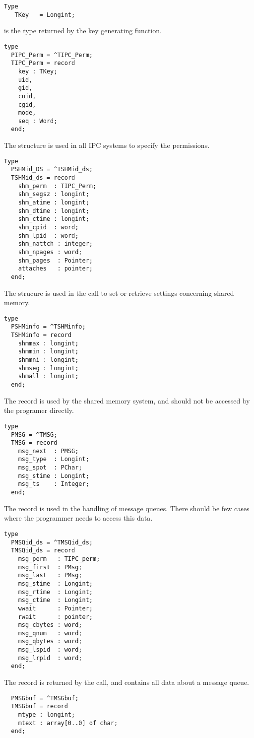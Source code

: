 \begin{verbatim}
Type 
   TKey   = Longint;
\end{verbatim}
 is the type returned by the  key generating function.
\begin{verbatim}
type
  PIPC_Perm = ^TIPC_Perm;
  TIPC_Perm = record
    key : TKey;
    uid, 
    gid,
    cuid,
    cgid,
    mode,
    seq : Word;   
  end;
\end{verbatim}
The  structure is used in all IPC systems to specify the
permissions.
\begin{verbatim}
Type  
  PSHMid_DS = ^TSHMid_ds; 
  TSHMid_ds = record
    shm_perm  : TIPC_Perm;
    shm_segsz : longint;
    shm_atime : longint;
    shm_dtime : longint;
    shm_ctime : longint;
    shm_cpid  : word;
    shm_lpid  : word;
    shm_nattch : integer;
    shm_npages : word;
    shm_pages  : Pointer;
    attaches   : pointer;
  end;
\end{verbatim}
The  strucure is used in the  call to set or
retrieve settings concerning shared memory.
\begin{verbatim}
type
  PSHMinfo = ^TSHMinfo;
  TSHMinfo = record
    shmmax : longint;
    shmmin : longint;
    shmmni : longint;
    shmseg : longint;
    shmall : longint;
  end;
\end{verbatim}
The  record is used by the shared memory system, and should
not be accessed by the programer directly.
\begin{verbatim}
type
  PMSG = ^TMSG;
  TMSG = record
    msg_next  : PMSG;
    msg_type  : Longint;
    msg_spot  : PChar;
    msg_stime : Longint;
    msg_ts    : Integer;
  end;
\end{verbatim}
The  record is used in the handling of message queues. There
should be few cases where the programmer needs to access this data.
\begin{verbatim}
type
  PMSQid_ds = ^TMSQid_ds;
  TMSQid_ds = record
    msg_perm   : TIPC_perm;
    msg_first  : PMsg;
    msg_last   : PMsg;
    msg_stime  : Longint;
    msg_rtime  : Longint;
    msg_ctime  : Longint;
    wwait      : Pointer;
    rwait      : pointer;
    msg_cbytes : word;
    msg_qnum   : word;
    msg_qbytes : word;
    msg_lspid  : word;
    msg_lrpid  : word;
  end;
\end{verbatim}
The  record is returned by the  call, and
contains all data about a message queue.
\begin{verbatim}
  PMSGbuf = ^TMSGbuf;
  TMSGbuf = record
    mtype : longint;
    mtext : array[0..0] of char;
  end;
\end{verbatim}
